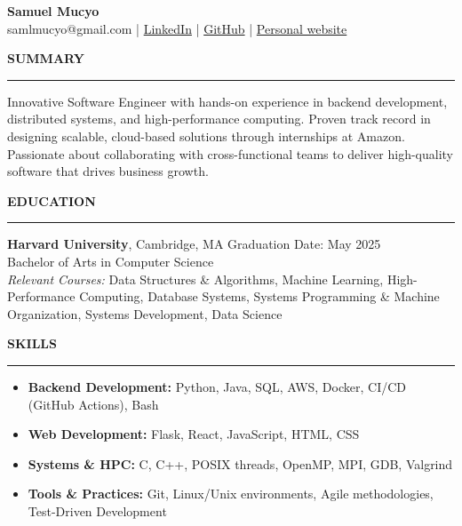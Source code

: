 \documentclass[11pt,a4paper]{article}
\newcommand{\sectionheading}[1]{\vspace{0.2cm}\textbf{\Large #1}\vspace{0.1cm}\hrule\vspace{0.3cm}}
\newcommand{\subheading}[1]{\textbf{#1}}
\newcommand{\daterange}[1]{\hfill{#1}}
\begin{document}
\begin{center}
    \textbf{\LARGE Samuel Mucyo}\\
    \vspace{0.3cm}
    samlmucyo@gmail.com \enspace | \enspace
    \href{https://www.linkedin.com/in/mucyo-samuel}{LinkedIn}
    \enspace | \enspace
    \href{https://github.com/Sam-Mucyo}{GitHub}
    \enspace | \enspace
    \href{https://sam-mucyo.github.io/}{Personal website}
\end{center}



\sectionheading{SUMMARY}
Innovative Software Engineer with hands-on experience in backend development, distributed systems, and high-performance computing. Proven track record in designing scalable, cloud-based solutions through internships at Amazon. Passionate about collaborating with cross-functional teams to deliver high-quality software that drives business growth.

\sectionheading{EDUCATION}
\subheading{Harvard University}, Cambridge, MA \daterange{Graduation Date: May 2025}\\
Bachelor of Arts in Computer Science\\
\textit{Relevant Courses:} Data Structures \& Algorithms, Machine Learning, High-Performance Computing, Database Systems, Systems Programming \& Machine Organization, Systems Development, Data Science

\sectionheading{SKILLS}
\begin{itemize}[leftmargin=*,nosep]
    \item \textbf{Backend Development:} Python, Java, SQL, AWS, Docker, CI/CD (GitHub Actions), Bash
    \item \textbf{Web Development:} Flask, React, JavaScript, HTML, CSS
    \item \textbf{Systems \& HPC:} C, C++, POSIX threads, OpenMP, MPI, GDB, Valgrind
    \item \textbf{Tools \& Practices:} Git, Linux/Unix environments, Agile methodologies, Test-Driven Development
\end{itemize}
\end{document}
